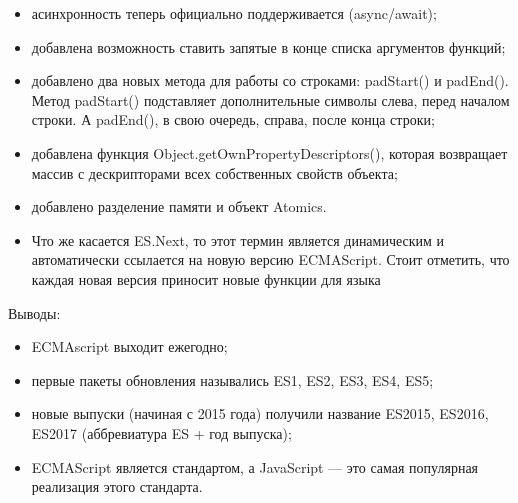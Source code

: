 \begin{itemize}
    \item асинхронность теперь официально поддерживается (async/await);
    \item добавлена возможность ставить запятые в конце списка аргументов функций;
    \item добавлено два новых метода для работы со строками: padStart() и padEnd(). Метод padStart() подставляет дополнительные символы слева, перед началом строки. А padEnd(), в свою очередь, справа, после конца строки;
    \item добавлена функция Object.getOwnPropertyDescriptors(), которая возвращает массив с дескрипторами всех собственных свойств объекта;
    \item добавлено разделение памяти и объект Atomics.
    \item Что же касается ES.Next, то этот термин является динамическим и автоматически ссылается на новую версию ECMAScript. Стоит отметить, что каждая новая версия приносит новые функции для языка
\end{itemize}

Выводы:

\begin{itemize}
    \item ECMAscript выходит ежегодно;
    \item первые пакеты обновления назывались ES1, ES2, ES3, ES4, ES5;
    \item новые выпуски (начиная с 2015 года) получили название ES2015, ES2016, ES2017 (аббревиатура ES + год выпуска);
    \item ECMAScript является стандартом, а JavaScript — это самая популярная реализация этого стандарта.
\end{itemize}